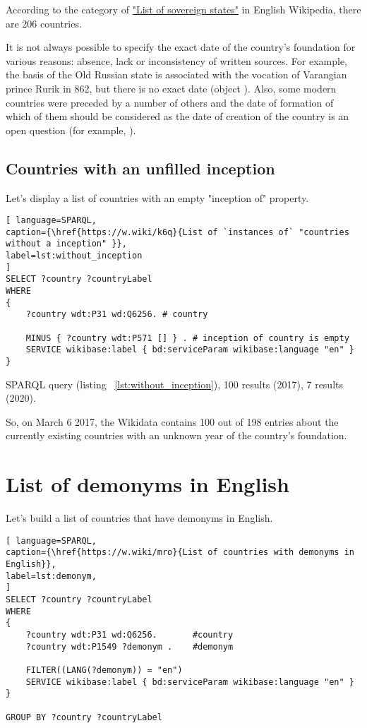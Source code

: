 According to the category of \href{https://en.wikipedia.org/wiki/List_of_sovereign_states}{"List of sovereign states"} in English Wikipedia, there are 206 countries.

It is not always possible to specify the exact date of the country's foundation for various reasons: absence, lack or inconsistency of written sources. For example, the basis of the Old Russian state is associated with the vocation of Varangian prince Rurik in 862, but there is no exact date (object ). Also, some modern countries were preceded by a number of others and the date of formation of which of them should be considered as the date of creation of the country is an open question (for example, ).

\subsection{Countries with an unfilled inception}

Let's display a list of countries with an empty "inception of" property.

\begin{lstlisting}[ language=SPARQL, 
caption={\href{https://w.wiki/k6q}{List of `instances of` "countries without a inception" }},
label=lst:without_inception
]
SELECT ?country ?countryLabel 
WHERE
{
	?country wdt:P31 wd:Q6256. # country
	
	MINUS { ?country wdt:P571 [] } . # inception of country is empty
	SERVICE wikibase:label { bd:serviceParam wikibase:language "en" }
}
\end{lstlisting}

SPARQL query (listing ~\ref{lst:without_inception}), 100 results (2017), 7 results (2020).

So, on March 6 2017, the Wikidata contains 100 out of 198 entries about the currently existing countries with an unknown year of the country's foundation.

\section{List of demonyms in English}

Let's build a list of countries that have demonyms in English.

\begin{lstlisting}[ language=SPARQL, 
caption={\href{https://w.wiki/mro}{List of countries with demonyms in English}},
label=lst:demonym, 
]
SELECT ?country ?countryLabel 
WHERE
{
	?country wdt:P31 wd:Q6256.       #country
	?country wdt:P1549 ?demonym .    #demonym
	
	FILTER((LANG(?demonym)) = "en")
	SERVICE wikibase:label { bd:serviceParam wikibase:language "en" }
}

GROUP BY ?country ?countryLabel
\end{lstlisting}

